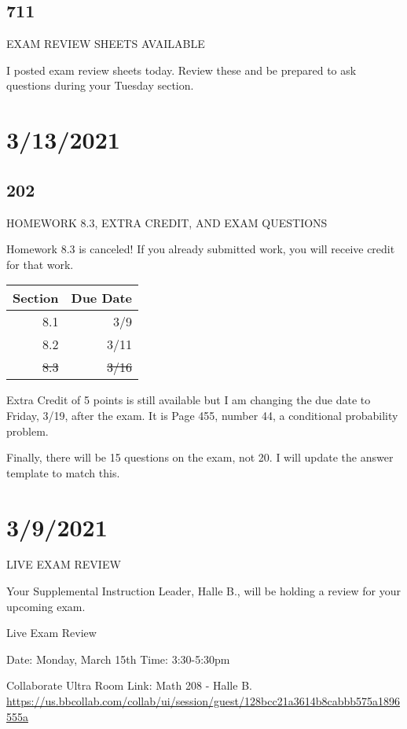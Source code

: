 \documentclass[]{article}
\begin{document}
\subsection*{711}
EXAM REVIEW SHEETS AVAILABLE

I posted exam review sheets today. Review these and be prepared to ask questions during your Tuesday section.



\section*{3/13/2021}
\subsection*{202}
HOMEWORK 8.3, EXTRA CREDIT, AND EXAM QUESTIONS

Homework 8.3 is canceled! If you already submitted work, you will receive credit for that work.

\bgroup
\def\arraystretch{1.5}
\begin{tabular}{|r|r|}
	\hline
	Section & Due Date \\
	\hline
	8.1 & 3/9 \\
	\hline
	8.2 & 3/11 \\
	\hline
	\sout{8.3} & \sout{3/16} \\
	\hline
\end{tabular}
\egroup

Extra Credit of 5 points is still available but I am changing the due date to Friday, 3/19, after the exam. It is Page 455, number 44, a conditional probability problem.

Finally, there will be 15 questions on the exam, not 20. I will update the answer template to match this.



\section*{3/9/2021}
LIVE EXAM REVIEW

Your Supplemental Instruction Leader, Halle B., will be holding a review for your upcoming exam.

Live Exam Review 

Date: Monday, March 15th
Time: 3:30-5:30pm

Collaborate Ultra Room Link: Math 208 - Halle B.
\url{https://us.bbcollab.com/collab/ui/session/guest/128bcc21a3614b8cabbb575a1896555a}
\end{document}
